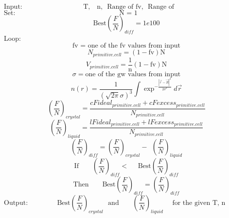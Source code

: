 \documentclass[double,12pt]{beavtex}
\begin{document}
\begin{displaymath}\text{Input:~~~~~~~~~~~~~~~~~~~~~~~~~~~T,~~ n,~~Range of fv,~~Range of gw~~~~~~~~~~~~~~~~~~~~~~~~~~~~~~~~~~~}\end{displaymath} 
\begin{displaymath}\text{Set:~~~~~~~~~~~~~~~~~~~~~~~~~~~~~~~~~~~~~~~~~~~~~~N~=~1~~~~~~~~~~~~~~~~~~~~~~~~~~~~~~~~~~~~~~~~~~~~~~~~~~~~}\end{displaymath} 
\begin{displaymath}\text{Best}\left(\frac{F}{N}\right)_{diff}= 1e100\end{displaymath}
Loop: 
\begin{displaymath}\text{fv = one of the fv values from input}\end{displaymath}
\begin{equation}N_{primitive.cell}=(1-\text{fv})\text{N}\end{equation}
\begin{equation}V_{primitive.cell}=\frac{\text{1}}{\text{n}}(1-\text{fv})\text{N}\end{equation}
\begin{displaymath}\sigma = \text{one of the gw values from input}\end{displaymath}
\begin{equation}{n(r)=\frac{1}{\left(\sqrt{2\pi}\sigma\right)^3}\int\exp^{-\frac{|\vec{r}-\vec{R}|^2}{2\sigma^2}}d\vec{r}}\end{equation} 
\begin{equation}\left(\frac{F}{N}\right)_{crystal}=\frac{cFideal_{primitive.cell} + cFexcess_{primitive.cell}}{N_{primitive.cell}}\end{equation}
\begin{equation}\left(\frac{F}{N}\right)_{liquid}=\frac{lFideal_{primitive.cell} + lFexcess_{primitive.cell}}{N_{primitive.cell}}\end{equation}
\begin{equation}\left(\frac{F}{N}\right)_{diff}=\left(\frac{F}{N}\right)_{crystal}-{~~}\left(\frac{F}{N}\right)_{liquid}\end{equation}
\begin{displaymath}\text{If~~~~~~}\left(\frac{F}{N}\right)_{diff}<\text{~~~~Best}\left(\frac{F}{N}\right)_{diff}\end{displaymath}
\begin{displaymath}\text{Then~~~~~~}\text{Best}\left(\frac{F}{N}\right)_{diff}=\left(\frac{F}{N}\right)_{diff}\end{displaymath}
\begin{displaymath}\text{Output:~~~~~~~~~~~~ Best}\left(\frac{F}{N}\right)_{crystal}\text{~~and~~~~~~}\left(\frac{F}{N}\right)_{liquid}\text{~~~~for the given T, n ~~~~~~~~~~~~~~~~~~~~~~~~~}\end{displaymath} 
\end{document}
